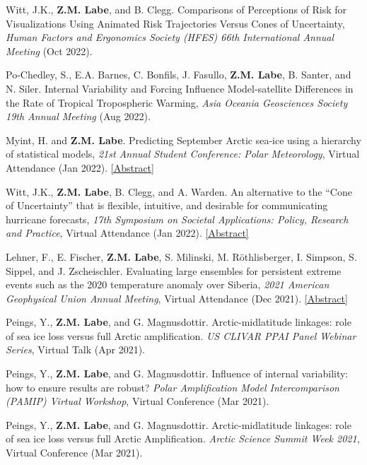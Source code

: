 \documentclass[margin,line,palatino,courier,10pt]{res}
\begin{document}
\begin{resume}
\begin{etaremune}[leftmargin=0in,topsep=0in,parsep=0in]
\item Witt, J.K., \textbf{Z.M. Labe}, and B. Clegg. Comparisons of Perceptions of Risk for Visualizations Using Animated Risk Trajectories Versus Cones of Uncertainty, \textit{Human Factors and Ergonomics Society (HFES) 66th International Annual Meeting} (Oct 2022).
\item Po-Chedley, S., E.A. Barnes, C. Bonfils, J. Fasullo, \textbf{Z.M. Labe}, B. Santer, and N. Siler. Internal Variability and Forcing Influence Model-satellite Differences in the Rate of Tropical Tropospheric Warming, \textit{Asia Oceania Geosciences Society 19th Annual Meeting} (Aug 2022).
\item Myint, H. and \textbf{Z.M. Labe}. Predicting September Arctic sea-ice using a hierarchy of statistical models, \textit{21st Annual Student Conference: Polar Meteorology}, Virtual Attendance (Jan 2022). \href{https://ams.confex.com/ams/102ANNUAL/meetingapp.cgi/Paper/391367}{[Abstract]}
\item Witt, J.K., \textbf{Z.M. Labe}, B. Clegg, and A. Warden. An alternative to the ``Cone of Uncertainty'' that is flexible, intuitive, and desirable for communicating hurricane forecasts, \textit{17th Symposium on Societal Applications: Policy, Research and Practice}, Virtual Attendance (Jan 2022). \href{https://ams.confex.com/ams/102ANNUAL/meetingapp.cgi/Paper/395666}{[Abstract]}
\item Lehner, F., E. Fischer, \textbf{Z.M. Labe}, S. Milinski, M. R\"{o}thlisberger, I. Simpson, S. Sippel, and J. Zscheischler. Evaluating large ensembles for persistent extreme events such as the 2020 temperature anomaly over Siberia, \textit{2021 American Geophysical Union Annual Meeting}, Virtual Attendance (Dec 2021). \href{https://agu.confex.com/agu/fm21/meetingapp.cgi/Paper/944312}{[Abstract]}
\item Peings, Y., \textbf{Z.M. Labe}, and G. Magnusdottir. Arctic-midlatitude linkages: role of sea ice loss versus full Arctic amplification. \textit{US CLIVAR PPAI Panel Webinar Series}, Virtual Talk (Apr 2021).
\item Peings, Y., \textbf{Z.M. Labe}, and G. Magnusdottir. Influence of internal variability: how to ensure results are robust? \textit{Polar Amplification Model Intercomparison (PAMIP) Virtual Workshop}, Virtual Conference (Mar 2021).
\item Peings, Y., \textbf{Z.M. Labe}, and G. Magnusdottir. Arctic-midlatitude linkages: role of sea ice loss versus full Arctic Amplification. \textit{Arctic Science Summit Week 2021}, Virtual Conference (Mar 2021).

\end{etaremune}
\end{resume}
\end{document}

